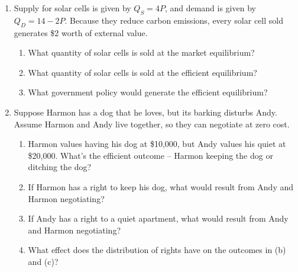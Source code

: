 \documentclass{article}
\begin{document}
\begin{enumerate}
\begin{enumerate}
	\item What are the price and quantity at the market equilibrium?
	
	\item What are the price and quantity at the efficient equilibrium?
	
	\item What is deadweight loss at the market equilibrium? 
	
	\end{enumerate}

\item Supply for solar cells is given by $Q_S = 4P$, and demand is given by $Q_D = 14 - 2P$. Because they reduce carbon emissions, every solar cell sold generates \$2 worth of external value.

	\begin{enumerate}
	
	\item What quantity of solar cells is sold at the market equilibrium?
	
	\item What  quantity of solar cells is sold at the efficient equilibrium? 
	
	\item What government policy would generate the efficient equilibrium?
	
	\end{enumerate}
	
\newpage

\item Suppose Harmon has a dog that he loves, but its barking disturbs Andy. Assume Harmon and Andy live together, so they can negotiate at zero cost.

	\begin{enumerate}
	
	\item Harmon values having his dog at \$10,000, but Andy values his quiet at \$20,000. What's the efficient outcome -- Harmon keeping the dog or ditching the dog?
	
	\item If Harmon has a right to keep his dog, what would result from Andy and Harmon negotiating?
	
	\item If Andy has a right to a quiet apartment, what would result from Andy and Harmon negotiating?
	
	\item What effect does the distribution of rights have on the outcomes in (b) and (c)?
	

\end{enumerate}
\end{enumerate}
\end{document}
